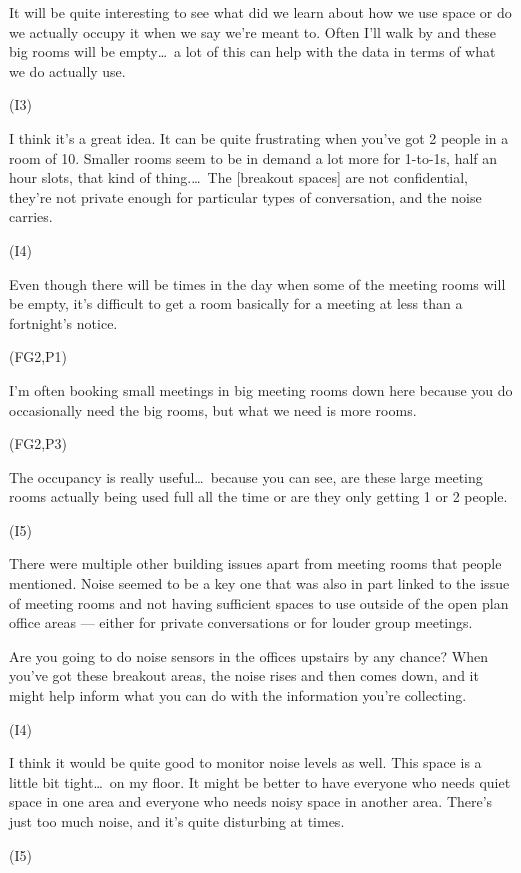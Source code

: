 \begin{qt}It will be quite interesting to see what did we learn about how we use space or do we actually
occupy it when we say we’re meant to. Often I’ll walk by and these
big rooms will be empty\ldots\  a lot of this can help with the
data in terms of what we do actually use.\end{qt} (I3)

\begin{qt}I think it’s a great idea. It can be quite frustrating
when you’ve got 2 people in a room of 10. Smaller rooms seem to be in
demand a lot more for 1-to-1s, half an hour slots, that kind of
thing.\ldots\  The [breakout spaces] are not confidential, they’re not
private enough for particular types of conversation, and the noise
carries.\end{qt} (I4)

\begin{qt}Even though there will be times in the day
when some of the meeting rooms will be empty, it’s difficult to get a room basically for a meeting at
less than a fortnight’s notice.\end{qt} (FG2,P1)

\begin{qt}I’m often booking small meetings in big meeting rooms
  down here because you do occasionally need the big rooms, but what
  we need is more rooms.\end{qt} (FG2,P3)

\begin{qt}The occupancy is
really useful\ldots\  because you can see, are these
large meeting rooms actually being used full all the time or are they
only getting 1 or 2 people.\end{qt} (I5)

There were multiple other building issues apart from meeting rooms
that people mentioned. Noise seemed to be a key one that was also in
part linked to the issue of meeting rooms and not having sufficient
spaces to use outside of the open plan office areas --- either for
private conversations or for louder group meetings.

\begin{qt}Are you going to do noise sensors in the offices upstairs by any
chance? When you’ve got these breakout areas, the noise rises and then
comes down, and it might help inform what you can do with the
information you’re collecting. \end{qt} (I4)

\begin{qt}I think it would be quite good to monitor noise levels as well. This
space is a little bit tight\ldots\  on my floor. It might be better to have
everyone who needs quiet space in one area and everyone who needs
noisy space in another area. There’s just too much noise, and it’s quite disturbing at times.\end{qt} (I5)

